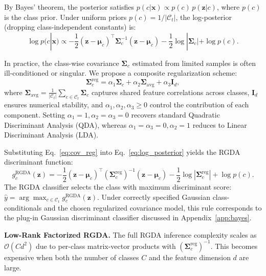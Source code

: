 \documentclass{article}
\begin{document}
By Bayes' theorem, the posterior satisfies $p(c|\mathbf{x}) \propto p(c) \, p(\mathbf{z}|c)$, where $p(c)$ is the class prior. Under uniform priors $p(c) = 1/|\mathcal{C}_t|$, the log-posterior (dropping class-independent constants) is:
\begin{equation}
    \log p(c|\mathbf{x}) \propto -\frac{1}{2}(\mathbf{z} - \boldsymbol{\mu}_c)^\top \mathbf{\Sigma}_c^{-1} (\mathbf{z} - \boldsymbol{\mu}_c) - \frac{1}{2}\log|\mathbf{\Sigma}_c| + \log p(c).
    \label{eq:log_posterior}
\end{equation}

In practice, the class-wise covariance $\mathbf{\Sigma}_c$ estimated from limited samples is often ill-conditioned or singular. We propose a composite regularization scheme:
\begin{equation}
    \mathbf{\Sigma}_c^{\text{reg}} = \alpha_1 \mathbf{\Sigma}_c + \alpha_2 \mathbf{\Sigma}_{\text{avg}} + \alpha_3 \mathbf{I}_d,
    \label{eq:cov_reg}
\end{equation}
where $\mathbf{\Sigma}_{\text{avg}} = \frac{1}{|\mathcal{C}_t|}\sum_{c \in \mathcal{C}_t} \mathbf{\Sigma}_c$ captures shared feature correlations across classes, $\mathbf{I}_d$ ensures numerical stability, and $\alpha_1, \alpha_2, \alpha_3 \geq 0$ control the contribution of each component. Setting $\alpha_1 = 1, \alpha_2 = \alpha_3 = 0$ recovers standard Quadratic Discriminant Analysis (QDA), whereas $\alpha_1 = \alpha_3 = 0, \alpha_2 = 1$ reduces to Linear Discriminant Analysis (LDA).

Substituting Eq.~\eqref{eq:cov_reg} into Eq.~\eqref{eq:log_posterior} yields the RGDA discriminant function:
\begin{equation}
    g_c^{\text{RGDA}}(\mathbf{z}) = -\frac{1}{2}(\mathbf{z} - \boldsymbol{\mu}_c)^\top (\mathbf{\Sigma}_c^{\text{reg}})^{-1} (\mathbf{z} - \boldsymbol{\mu}_c) - \frac{1}{2}\log|\mathbf{\Sigma}_c^{\text{reg}}| + \log p(c).
    \label{eq:rgda}
\end{equation}
The RGDA classifier selects the class with maximum discriminant score: $\hat{y} = \arg\max_{c \in \mathcal{C}_t} g_c^{\text{RGDA}}(\mathbf{z})$. Under correctly specified Gaussian class-conditionals and the chosen regularized covariance model, this rule corresponds to the plug-in Gaussian discriminant classifier discussed in Appendix~\ref{app:bayes}.

\textbf{Low-Rank Factorized RGDA.}
The full RGDA inference complexity scales as $\mathcal{O}(Cd^2)$ due to per-class matrix-vector products with $(\mathbf{\Sigma}_c^{\text{reg}})^{-1}$. This becomes expensive when both the number of classes $C$ and the feature dimension $d$ are large.
\end{document}
